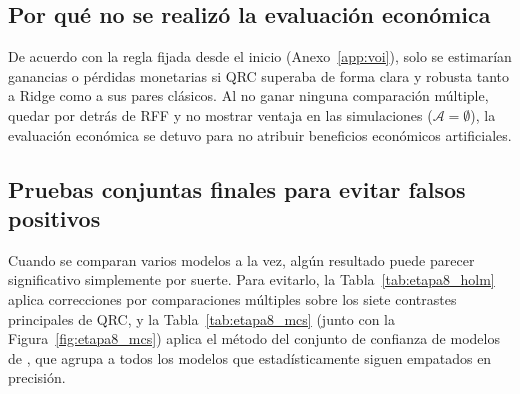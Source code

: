 \subsection{Por qué no se realizó la evaluación económica}
\label{subsec:analisis_economico}

De acuerdo con la regla fijada desde el inicio (Anexo~\ref{app:voi}), solo se estimarían ganancias o pérdidas monetarias si QRC superaba de forma clara y robusta tanto a Ridge como a sus pares clásicos. Al no ganar ninguna comparación múltiple, quedar por detrás de RFF y no mostrar ventaja en las simulaciones (\(\mathcal{A}=\emptyset\)), la evaluación económica se detuvo para no atribuir beneficios económicos artificiales.

\subsection{Pruebas conjuntas finales para evitar falsos positivos}
\label{subsec:inferencia_integrada_etapa8}

Cuando se comparan varios modelos a la vez, algún resultado puede parecer significativo simplemente por suerte. Para evitarlo, la Tabla~\ref{tab:etapa8_holm} aplica correcciones por comparaciones múltiples \parencite{holm1979,benjamini1995} sobre los siete contrastes principales de QRC, y la Tabla~\ref{tab:etapa8_mcs} (junto con la Figura~\ref{fig:etapa8_mcs}) aplica el método del conjunto de confianza de modelos de \textcite{hansen2011}, que agrupa a todos los modelos que estadísticamente siguen empatados en precisión.


